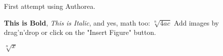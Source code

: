 First attempt using Authorea.

\textbf{This is Bold}, \textit{This is Italic}, and yes, math too: $\sqrt[n]{4ac}$ Add images by drag'n'drop or click on the "Insert Figure" button.

$\sqrt[n]{x}$